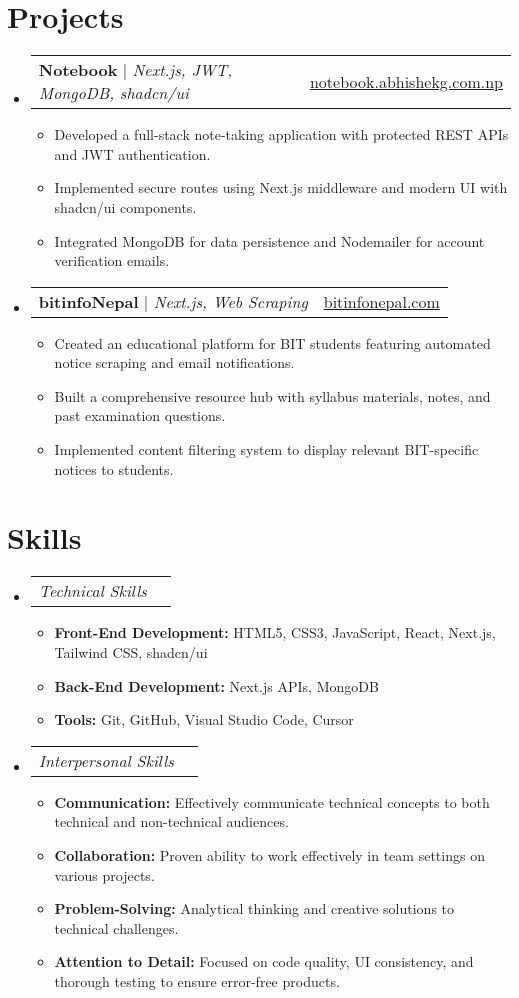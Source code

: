 \documentclass[letterpaper,11pt]{article}
\makeatletter
\newcommand{\resumeItem}[1]{
  \item\small{
    {#1 \vspace{-2pt}}
  }
}
\newcommand{\resumeSubSubheading}[2]{
    \item
    \begin{tabular*}{0.97\textwidth}{l@{\extracolsep{\fill}}r}
      \textit{\small#1} & \textit{\small #2} \\
    \end{tabular*}\vspace{-7pt}
}
\newcommand{\resumeProjectHeading}[2]{
    \item
    \begin{tabular*}{0.97\textwidth}{l@{\extracolsep{\fill}}r}
      \small#1 & #2 \\
    \end{tabular*}\vspace{-7pt}
}
\newcommand{\resumeSubHeadingListStart}{\begin{itemize}[leftmargin=0.15in, label={}]}
\newcommand{\resumeSubHeadingListEnd}{\end{itemize}}
\newcommand{\resumeItemListStart}{\begin{itemize}}
\newcommand{\resumeItemListEnd}{\end{itemize}\vspace{-5pt}}
\makeatother
\begin{document}
\section{Projects}
    \resumeSubHeadingListStart
      \resumeProjectHeading
          {\textbf{Notebook} $|$ \emph{Next.js, JWT, MongoDB, shadcn/ui}}{\href{https://notebook.abhishekg.com.np}{notebook.abhishekg.com.np}}
          \resumeItemListStart
            \resumeItem{Developed a full-stack note-taking application with protected REST APIs and JWT authentication.}
            \resumeItem{Implemented secure routes using Next.js middleware and modern UI with shadcn/ui components.}
            \resumeItem{Integrated MongoDB for data persistence and Nodemailer for account verification emails.}
          \resumeItemListEnd
          
     \resumeProjectHeading
    {\textbf{bitinfoNepal} $|$ \emph{Next.js, Web Scraping}}{\href{https://bitinfonepal.com}{bitinfonepal.com}}
    \resumeItemListStart
      \resumeItem{Created an educational platform for BIT students featuring automated notice scraping and email notifications.}
      \resumeItem{Built a comprehensive resource hub with syllabus materials, notes, and past examination questions.}
      \resumeItem{Implemented content filtering system to display relevant BIT-specific notices to students.}
    \resumeItemListEnd
\resumeSubHeadingListEnd

\section{Skills}
\resumeSubHeadingListStart
  \resumeSubSubheading{Technical Skills}{}
  \resumeItemListStart
    \resumeItem{\textbf{Front-End Development:} HTML5, CSS3, JavaScript, React, Next.js, Tailwind CSS, shadcn/ui}
    \resumeItem{\textbf{Back-End Development:} Next.js APIs, MongoDB}
    \resumeItem{\textbf{Tools:} Git, GitHub, Visual Studio Code, Cursor}
  \resumeItemListEnd
\resumeSubHeadingListEnd

\resumeSubHeadingListStart
  \resumeSubSubheading{Interpersonal Skills}{}
  \resumeItemListStart
    \resumeItem{\textbf{Communication:} Effectively communicate technical concepts to both technical and non-technical audiences.}
    \resumeItem{\textbf{Collaboration:} Proven ability to work effectively in team settings on various projects.}
    \resumeItem{\textbf{Problem-Solving:} Analytical thinking and creative solutions to technical challenges.}
    \resumeItem{\textbf{Attention to Detail:} Focused on code quality, UI consistency, and thorough testing to ensure error-free products.}
  \resumeItemListEnd
\resumeSubHeadingListEnd
\end{document}
